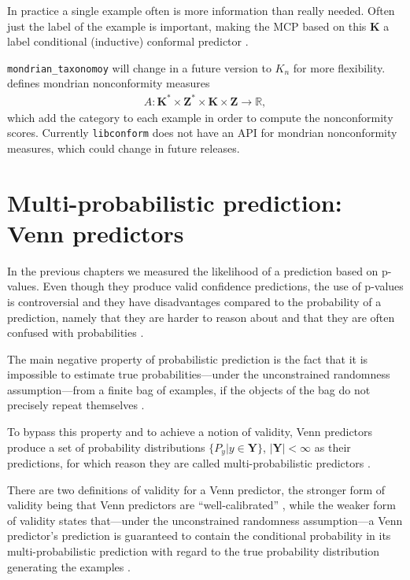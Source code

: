 \documentclass[twoside,11pt]{article}
\def\libconform{\texttt{libconform}}
\begin{document}
In practice a single example often is more information than
really needed.
Often just the label of the example is important, making
the MCP based on this $\textbf{K}$ a label conditional
(inductive) conformal predictor
\citep[see][Chapter 2]{cprml}.

\texttt{mondrian\_taxonomoy} will change in a future
version to $K_n$ for more flexibility.
\\

\noindent
\citet[Chapter 4.5]{alrw} defines mondrian nonconformity
measures
\begin{align*}
  A: \textbf{K}^* \times \textbf{Z}^* \times
  \textbf{K} \times \textbf{Z} \rightarrow \mathbb{R},
\end{align*}
which add the category to each example in order to compute
the nonconformity scores.
Currently \libconform{} does not have an API for mondrian
nonconformity measures, which could change in
future releases.

\section{Multi-probabilistic prediction: Venn predictors}
\label{sec:venn}

In the previous chapters we measured the likelihood of a
prediction based on p-values. Even though they produce
valid confidence predictions, the use of p-values is
controversial and they have disadvantages compared to
the probability of a prediction, namely that they are
harder to reason about and that they are often confused
with probabilities \citep[see][Chapter 6.3]{alrw}.

The main negative property of probabilistic prediction is
the fact that it is impossible to estimate true
probabilities---under the unconstrained randomness
assumption---from a finite bag of examples, if the objects
of the bag do not precisely repeat themselves
\citep[see][Chapter 5]{alrw}.

To bypass this property and to achieve a notion of
validity, Venn predictors produce a set of probability
distributions $\{P_y|y\in \textbf{Y}\}$,
$|\textbf{Y}| < \infty$ as their predictions, for which
reason they are called multi-probabilistic predictors
\citep[see][Chapter 2.8]{cprml}.

There are two definitions of validity for a Venn predictor,
the stronger form of validity being that Venn predictors
are ``well-calibrated'' \citep[see][Chapter 6]{alrw}, while
the weaker form of validity states that---under the
unconstrained randomness assumption---a Venn predictor's
prediction is guaranteed to contain the conditional
probability in its multi-probabilistic prediction with
regard to the true probability distribution generating the
examples \citep[see][Chapter 2.8]{cprml}.
\end{document}
